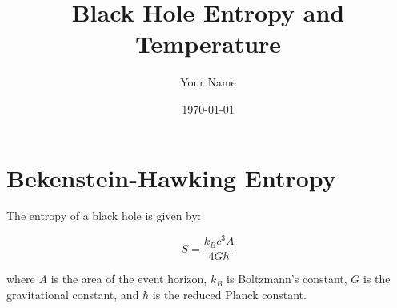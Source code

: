 \documentclass{article}
\begin{document}
    \title{Black Hole Entropy and Temperature}
    \author{Your Name}
    \date{\today}
    \maketitle

    \section{Bekenstein-Hawking Entropy}
    The entropy of a black hole is given by:

    \begin{equation}
        S = \frac{k_B c^3 A}{4 G \hbar}
    \end{equation}

    where \( A \) is the area of the event horizon, \( k_B \) is Boltzmann's constant, \( G \) is the gravitational constant, and \( \hbar \) is the reduced Planck constant.

    
\end{document}
